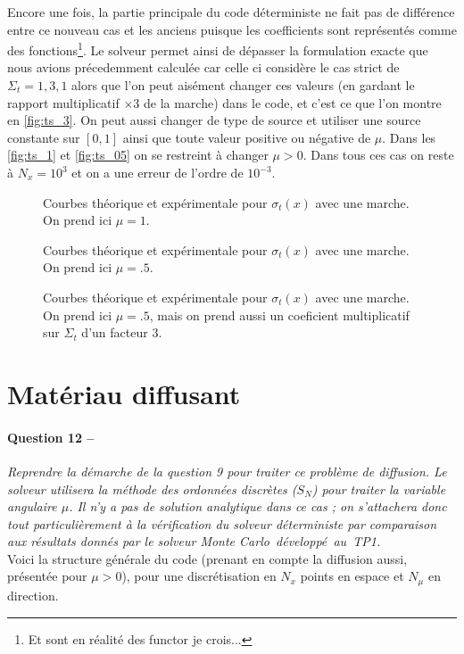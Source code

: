 \documentclass[11pt,a4paper]{article}
\newcommand{\question}[2]{\paragraph{Question #1 --}\hspace{-7pt}\textit{#2} \\}
\begin{document}
Encore une fois, la partie principale du code déterministe ne fait pas de différence entre ce nouveau cas et les anciens puisque les coefficients sont représentés comme des fonctions\footnote{Et sont en réalité des functor je crois...}. Le solveur permet ainsi de dépasser la formulation exacte que nous avions précedemment calculée car celle ci considère le cas strict de $\Sigma_t=1, 3, 1$ alors que l'on peut aisément changer ces valeurs (en gardant le rapport multiplicatif $\times3$ de la marche) dans le code, et c'est ce que l'on montre en \autoref{fig:ts_3}. On peut aussi changer de type de source et utiliser une source constante sur $[0,1]$ ainsi que toute valeur positive ou négative de $\mu$. Dans les \autoref{fig:ts_1} et \autoref{fig:ts_05} on se restreint à changer $\mu>0$. Dans tous ces cas on reste à $N_x=10^3$ et on a une erreur de l'ordre de $10^{-3}$.
\begin{figure}
  \centering
  
  \caption{Courbes théorique et expérimentale pour $\sigma_t(x)$ avec une marche. On prend ici $\mu=1$. }
  \label{fig:ts_1}
\end{figure}
\begin{figure}
  \centering
  
  \caption{Courbes théorique et expérimentale pour $\sigma_t(x)$ avec une marche. On prend ici $\mu=.5$. }
  \label{fig:ts_05}
\end{figure}
\begin{figure}
  \centering
  
  \caption{Courbes théorique et expérimentale pour $\sigma_t(x)$ avec une marche. On prend ici $\mu=.5$, mais on prend aussi un coeficient multiplicatif sur $\Sigma_t$ d'un facteur $3$. }
  \label{fig:ts_3}
\end{figure}


\section{Matériau diffusant}

\question{12}{Reprendre la démarche de la question 9 pour traiter ce problème de diffusion.
Le solveur utilisera la méthode des ordonnées discrètes ($S_N$) pour traiter la variable angulaire $\mu$.
Il n'y a pas de solution analytique dans ce cas ; on s'attachera donc tout particulièrement à la vérification du solveur déterministe par comparaison aux résultats donnés par le solveur Monte \mbox{Carlo développé au TP1}.}

Voici la structure générale du code (prenant en compte la diffusion aussi, présentée pour $\mu>0$), pour une discrétisation en $N_x$ points en espace et $N_{\mu}$ en direction.
\end{document}
